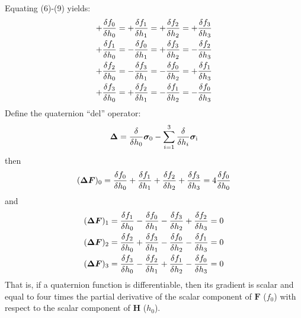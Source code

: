 \documentclass[12pt]{article}
\newcommand{\pauli}[1]{\ensuremath{ {\bm\sigma}_{\rm #1} }}
\newcommand{\pdi}[2]{\ensuremath{ {{\delta {#2}}\over{\delta {#1}}} }}
\begin{document}
Equating (6)-(9) yields:
\begin{eqnarray}
+ { {\delta{f_0}}\over{\delta{h_0}} } = + { {\delta{f_1}}\over{\delta{h_1}} } =
+ { {\delta{f_2}}\over{\delta{h_2}} } = + { {\delta{f_3}}\over{\delta{h_3}} }\\
+ { {\delta{f_1}}\over{\delta{h_0}} } = - { {\delta{f_0}}\over{\delta{h_1}} } =
+ { {\delta{f_3}}\over{\delta{h_2}} } = - { {\delta{f_2}}\over{\delta{h_3}} }\\
+ { {\delta{f_2}}\over{\delta{h_0}} } = - { {\delta{f_3}}\over{\delta{h_1}} } =
- { {\delta{f_0}}\over{\delta{h_2}} } = + { {\delta{f_1}}\over{\delta{h_3}} }\\
+ { {\delta{f_3}}\over{\delta{h_0}} } = + { {\delta{f_2}}\over{\delta{h_1}} } =
- { {\delta{f_1}}\over{\delta{h_2}} } = - { {\delta{f_0}}\over{\delta{h_3}} }
\end{eqnarray}
Define the quaternion ``del'' operator:
\begin{equation}
\bm{\Delta}= {\delta\over\delta h_0}\pauli{0} 
	- \sum_{i=1}^3{\delta\over\delta h_i}\pauli{i}
\end{equation}
then
\begin{eqnarray}
(\bm{\Delta F})_0
  = \pdi{h_0}{f_0} + \pdi{h_1}{f_1} + \pdi{h_2}{f_2} + \pdi{h_3}{f_3}
  = 4\pdi{h_0}{f_0}
\end{eqnarray}
and
\begin{eqnarray}
(\bm{\Delta F})_1
  = \pdi{h_0}{f_1} - \pdi{h_1}{f_0} - \pdi{h_2}{f_3} + \pdi{h_3}{f_2} = 0 \\
(\bm{\Delta F})_2
  = \pdi{h_0}{f_2} + \pdi{h_1}{f_3} - \pdi{h_2}{f_0} - \pdi{h_3}{f_1} = 0 \\
(\bm{\Delta F})_3
  = \pdi{h_0}{f_3} - \pdi{h_1}{f_2} + \pdi{h_2}{f_1} - \pdi{h_3}{f_0} = 0
\end{eqnarray}
That is, if a quaternion function is differentiable, then its gradient
is scalar and equal to four times the partial derivative of the scalar
component of $\bm{F}$ ($f_0$) with respect to the scalar component of 
$\bm{H}$ ($h_0$).
\end{document}
